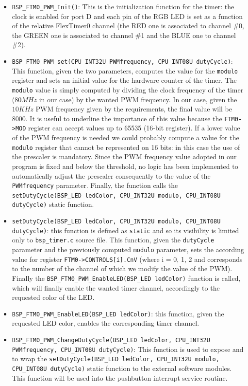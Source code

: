 \documentclass[a4paper]{article}
\begin{document}
        \begin{itemize}
            \item \texttt{BSP\_FTM0\_PWM\_Init()}: This is the initialization function for the timer: the clock is enabled for port D and each pin of the RGB LED is set as a function of the relative FlexTimer0 channel (the RED one is associated to channel \#0, the GREEN one is associated to channel \#1 and the BLUE one to channel \#2).
            \item \texttt{BSP\_FTM0\_PWM\_set(CPU\_INT32U PWMfrequency, CPU\_INT08U dutyCycle)}: This function, given the two parameters, computes the value for the \texttt{modulo} register and sets an initial value for the hardware counter of the timer. The \texttt{modulo} value is simply computed by dividing the clock frequency of the timer ($80MHz$ in our case) by the wanted PWM frequency. In our case, given the $10KHz$ PWM frequency given by the requirements, the final value will be 8000. It is useful to underline the importance of this value because the \texttt{FTM0->MOD} register can accept values up to 65535 (16-bit register). If a lower value of the PWM frequency is needed we could probably compute a value for the \texttt{modulo} register that cannot be represented on 16 bits: in this case the use of the prescaler is mandatory. Since the PWM frequency value adopted in our program is fixed and below the threshold, no logic has been implemented to automatically adjust the prescaler consequently to the value of the \texttt{PWMfrequency} parameter. Finally, the function calls the \texttt{setDutyCycle(BSP\_LED ledColor, CPU\_INT32U modulo, CPU\_INT08U dutyCycle)} static function.
            \item \texttt{setDutyCycle(BSP\_LED ledColor, CPU\_INT32U modulo, CPU\_INT08U dutyCycle)}: this function is defined as \texttt{static} and so its visibility is limited only to \texttt{bsp\_timer.c} source file. This function, given the \texttt{dutyCycle} parameter and the previously computed \texttt{modulo} parameter, sets the according value for register \texttt{FTM0->CONTROLS[i].CnV} (where i = 0, 1, 2 and corresponds to the number of the channel of which we modify the value of the PWM). Finally the \texttt{BSP\_FTM0\_PWM\_EnableLED(BSP\_LED ledColor)} function is called, which will finally enable the wanted timer channel, accordingly to the requested color of the LED.
            \item \texttt{BSP\_FTM0\_PWM\_EnableLED(BSP\_LED ledColor)}: this function, given the requested LED color, enables the corresponding timer channel.
            \item \texttt{BSP\_FTM0\_PWM\_ChangeDutyCycle(BSP\_LED ledColor, CPU\_INT32U PWMfrequency, CPU\_INT08U dutyCycle)}: This function is used to expose and to wrap the \texttt{setDutyCycle(BSP\_LED ledColor, CPU\_INT32U modulo, CPU\_INT08U dutyCycle)} static function to the external software modules. This function will be used into the pushbutton interrupt service routine.
        \end{itemize}
\end{document}
